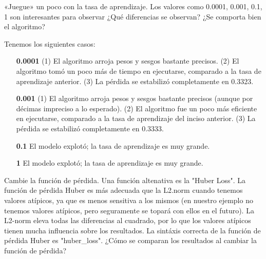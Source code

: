 \begin{problema}
	«Juegue» un poco con la tasa de aprendizaje. Los valores como 0.0001, 0.001, 0.1, 1 son interesantes para observar ¿Qué diferencias se observan? ¿Se comporta bien el algoritmo?
\end{problema}
\begin{sol} Tenemos los siguientes casos: 
	\begin{enumerate}
		\item[\textbf{0.0001}] (1) El algoritmo arroja pesos y sesgos bastante precisos. (2) El algoritmo tomó un poco más de tiempo en ejecutarse, comparado a la tasa de aprendizaje anterior. (3) La pérdida se estabilizó completamente en 0.3323. 
		\item[\textbf{0.001}] (1) El algoritmo arroja pesos y sesgos bastante precisos (aunque por décimas impreciso a lo esperado). (2) El algoritmo fue un poco más eficiente en ejecutarse, comparado a la tasa de aprendizaje del inciso anterior. (3) La pérdida se estabilizó completamente en 0.3333. 
		\item[\textbf{0.1}] El modelo explotó; la tasa de aprendizaje es muy grande.
		\item[\textbf{1}]  El modelo explotó; la tasa de aprendizaje es muy grande.
	\end{enumerate}
\end{sol}
\begin{problema}
	Cambie la función de pérdida. Una función altenativa es la "Huber Loss". \bigbreak 
La función de pérdida Huber es más adecuada que la L2.norm cuando tenemos valores atípicos, ya que es menos sensitiva a los mismos (en nuestro ejemplo no tenemos valores atípicos, pero seguramente se topará con ellos en el futuro). La L2-norm eleva todas las diferencias al cuadrado, por lo que los valores atípicos tienen mucha influencia sobre los resultados. La sintáxis correcta de la función de pérdida Huber es "huber\_loss".
\bigbreak 
	¿Cómo se comparan los resultados al cambiar la función de pérdida?
\end{problema}
